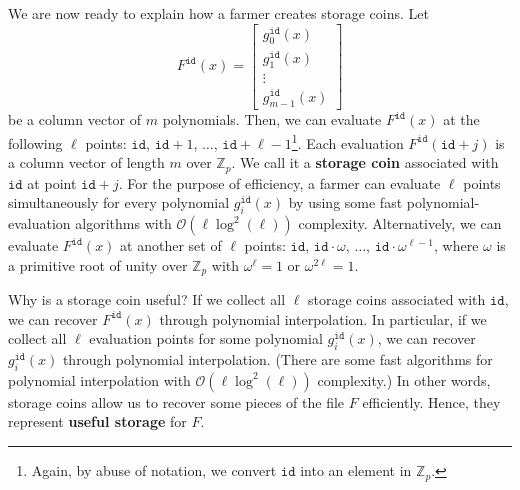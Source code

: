 \documentclass[conference]{IEEEtran}
\newcommand{\Fp}{\mathbb{Z}_p}
\newcommand{\id}{\texttt{id}}
\begin{document}
We are now ready to explain how a farmer creates storage coins. Let
\[
F^{\id}(x) = \begin{bmatrix} g_0^{\id}(x)\\ g_1^{\id}(x)\\  \vdots \\ g_{m-1}^{\id}(x) \end{bmatrix}
\]
be a column vector of $m$ polynomials. 
Then, we can evaluate $F^{\id}(x)$ at the following $\ell$ points: $\id$, $\id + 1$, $\ldots$, $\id + \ell - 1$\footnote{Again, by abuse of notation, we convert $\id$ into an element in $\Fp$.}.
Each evaluation $F^{\id}(\id + j)$ is a column vector of length $m$ over $\Fp$. We  call it a {\bf storage coin}
associated with $\id$ at point $\id + j$.
For the purpose of efficiency, a farmer can evaluate $\ell$ points simultaneously for every polynomial $g_i^{\id}(x)$
by using some fast polynomial-evaluation algorithms with $\mathcal{O}(\ell \log^2(\ell))$ complexity.
Alternatively, we can evaluate $F^{\id}(x)$ at another set of $\ell$ points: $\id$, $\id \cdot \omega$, $\ldots$, $\id \cdot \omega^{\ell - 1}$, where $\omega$ is a primitive root of unity over $\Fp$ with $\omega^\ell = 1$ or $\omega^{2 \ell} = 1$.


Why is a storage coin useful? If we collect all $\ell$ storage coins associated with $\id$, we can recover $F^{\id}(x)$ through polynomial interpolation.
In particular, if we collect all $\ell$ evaluation points for some polynomial $g_i^{\id}(x)$, we can recover $g_i^{\id}(x)$ through polynomial interpolation.
(There are some fast algorithms for polynomial interpolation with $\mathcal{O}(\ell \log^2(\ell))$ complexity.)
In other words, storage coins allow us to recover some pieces of the file $F$ efficiently. Hence, they represent {\bf useful storage} for $F$.
\end{document}
